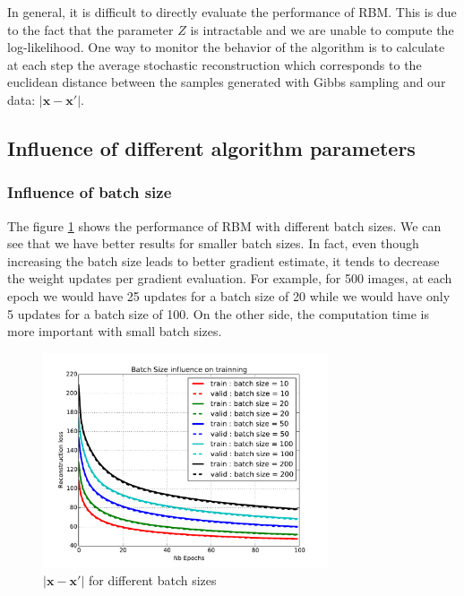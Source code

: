 \documentclass{article}
\begin{document}
In general, it is difficult to directly evaluate the performance of RBM. This is due to the fact that the parameter $Z$ is intractable and we are unable to compute the log-likelihood. One way to monitor the behavior of the algorithm is to calculate at each step the average stochastic reconstruction which corresponds to the euclidean distance between the samples generated with Gibbs sampling and our data: $\lvert \mathbf{x} - \mathbf{x'} \rvert$.

\subsection{Influence of different algorithm parameters}

\subsubsection{Influence of batch size}
\label{subsubsec:BS}

The figure \ref{fig:batch} shows the performance of RBM with different batch sizes. We can see that we have better results for smaller batch sizes. In fact, even though increasing the batch size leads to better gradient estimate, it tends to decrease the weight updates per gradient evaluation. For example, for 500 images, at each epoch we would have 25 updates for a batch size of 20 while we would have only 5 updates for a batch size of 100. On the other side, the computation time is more important with small batch sizes.

\begin{figure}
\centering
\includegraphics[width=0.75\textwidth]{batchsize}
\caption{$\lvert \mathbf{x} - \mathbf{x'} \rvert$ for different batch sizes}
\label{fig:batch}
\end{figure}
\end{document}
